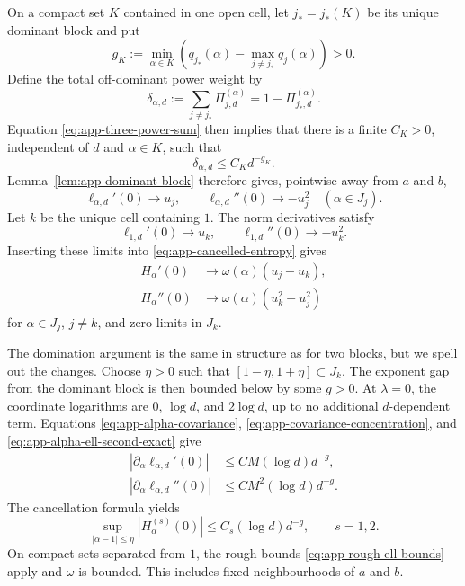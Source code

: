 \documentclass[aps,pra,11pt,onecolumn,nofootinbib,tightenlines]{revtex4-2}
\theoremstyle{definition}
\begin{document}
On a compact set $K$ contained in one open cell, let $j_*=j_*(K)$ be its
unique dominant block and put
\begin{equation}
 g_K:=\min_{\alpha\in K}
 \left(q_{j_*}(\alpha)-\max_{j\neq j_*}q_j(\alpha)\right)>0.
 \label{eq:app-three-gap-def}
\end{equation}
Define the total off-dominant power weight by
\begin{equation}
 \delta_{\alpha,d}
 :=\sum_{j\neq j_*}\Pi_{j,d}^{(\alpha)}
 =1-\Pi_{j_*,d}^{(\alpha)}.
 \label{eq:app-three-off-dominant-definition}
\end{equation}
Equation \eqref{eq:app-three-power-sum} then implies that there is a finite
$C_K>0$, independent of $d$ and $\alpha\in K$, such that
\begin{equation}
 \delta_{\alpha,d}\leq C_Kd^{-g_K}.
 \label{eq:app-three-cell-gap}
\end{equation}
Lemma~\ref{lem:app-dominant-block} therefore gives, pointwise away from $a$ and $b$,
\begin{equation}
 \ell_{\alpha,d}'(0)\longrightarrow u_j,
 \qquad
 \ell_{\alpha,d}''(0)\longrightarrow-u_j^2
 \quad(\alpha\in J_j).
 \label{eq:app-three-ell-cell-limit}
\end{equation}
Let $k$ be the unique cell containing $1$.  The norm derivatives satisfy
\begin{equation}
 \ell_{1,d}'(0)\longrightarrow u_k,
 \qquad
 \ell_{1,d}''(0)\longrightarrow-u_k^2.
 \label{eq:app-three-norm-limit}
\end{equation}
Inserting these limits into \eqref{eq:app-cancelled-entropy} gives
\begin{align}
 H_\alpha'(0)&\longrightarrow
 \omega(\alpha)(u_j-u_k),
 \label{eq:app-three-H-first-pointwise}\\
 H_\alpha''(0)&\longrightarrow
 \omega(\alpha)(u_k^2-u_j^2)
 \label{eq:app-three-H-second-pointwise}
\end{align}
for $\alpha\in J_j$, $j\neq k$, and zero limits in $J_k$.

The domination argument is the same in structure as for two blocks, but we spell out the changes.  Choose $\eta>0$ such that $[1-\eta,1+\eta]\subset J_k$.  The exponent gap from the dominant block is then bounded below by some $g>0$.  At $\lambda=0$, the coordinate logarithms are $0$, $\log d$, and $2\log d$, up to no additional $d$-dependent term.  Equations \eqref{eq:app-alpha-covariance}, \eqref{eq:app-covariance-concentration}, and \eqref{eq:app-alpha-ell-second-exact} give
\begin{align}
 |\partial_\alpha\ell_{\alpha,d}'(0)|
 &\leq C M(\log d)d^{-g},
 \label{eq:app-three-alpha-first}\\
 |\partial_\alpha\ell_{\alpha,d}''(0)|
 &\leq C M^2(\log d)d^{-g}.
 \label{eq:app-three-alpha-second}
\end{align}
The cancellation formula yields
\begin{equation}
 \sup_{|\alpha-1|\leq\eta}|H_\alpha^{(s)}(0)|
 \leq C_s(\log d)d^{-g},
 \qquad s=1,2.
 \label{eq:app-three-near-one}
\end{equation}
On compact sets separated from $1$, the rough bounds \eqref{eq:app-rough-ell-bounds} apply and $\omega$ is bounded.  This includes fixed neighbourhoods of $a$ and $b$.
\end{document}
